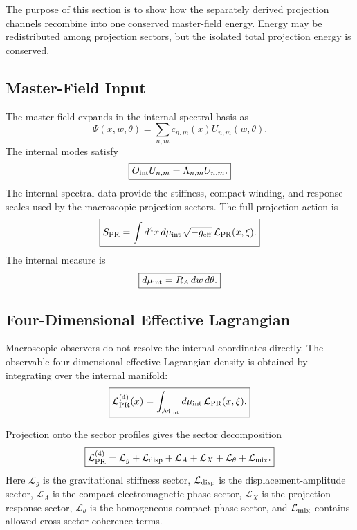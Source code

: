 \documentclass[11pt]{article}
\begin{document}
The purpose of this section is to show how the separately derived projection
channels recombine into one conserved master-field energy. Energy may be
redistributed among projection sectors, but the isolated total projection energy
is conserved.

\subsection{Master-Field Input}

The master field expands in the internal spectral basis as
\begin{equation}
\boxed{
\Psi(x,w,\theta)
=
\sum_{n,m}
c_{n,m}(x)U_{n,m}(w,\theta).
}
\end{equation}
The internal modes satisfy
\begin{equation}
\boxed{
O_{\rm int}U_{n,m}
=
\Lambda_{n,m}U_{n,m}.
}
\end{equation}
The internal spectral data provide the stiffness, compact winding, and response
scales used by the macroscopic projection sectors. The full projection action is
\begin{equation}
\boxed{
S_{\rm PR}
=
\int d^4x\,d\mu_{\rm int}\,
\sqrt{-g_{\rm eff}}\,
\mathcal L_{\rm PR}(x,\xi).
}
\end{equation}
The internal measure is
\begin{equation}
\boxed{
d\mu_{\rm int}
=
R_A\,dw\,d\theta .
}
\end{equation}

\subsection{Four-Dimensional Effective Lagrangian}

Macroscopic observers do not resolve the internal coordinates directly. The
observable four-dimensional effective Lagrangian density is obtained by
integrating over the internal manifold:
\begin{equation}
\boxed{
\mathcal L_{\rm PR}^{(4)}(x)
=
\int_{\mathcal M_{\rm int}}
d\mu_{\rm int}\,
\mathcal L_{\rm PR}(x,\xi).
}
\end{equation}

Projection onto the sector profiles gives the sector decomposition
\begin{equation}
\boxed{
\mathcal L_{\rm PR}^{(4)}
=
\mathcal L_g
+
\mathcal L_{\rm disp}
+
\mathcal L_A
+
\mathcal L_X
+
\mathcal L_\theta
+
\mathcal L_{\rm mix}.
}
\end{equation}
Here \(\mathcal L_g\) is the gravitational stiffness sector,
\(\mathcal L_{\rm disp}\) is the displacement-amplitude sector,
\(\mathcal L_A\) is the compact electromagnetic phase sector,
\(\mathcal L_X\) is the projection-response sector, \(\mathcal L_\theta\) is
the homogeneous compact-phase sector, and \(\mathcal L_{\rm mix}\) contains
allowed cross-sector coherence terms.
\end{document}
